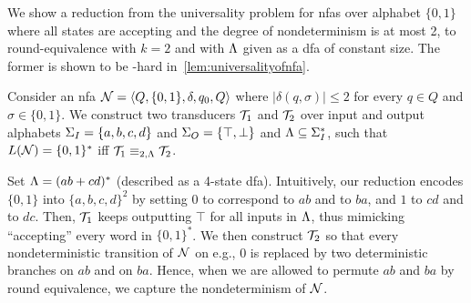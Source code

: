 We show a reduction from the universality problem for \glspl{nfa} over alphabet $\{0,1\}$ where all states are accepting and the degree of nondeterminism is at most 2, to round-equivalence with $k=2$ and with $\Lambda$ given as a \gls{dfa} of constant size. The former is shown to be \PSPACE-hard in~\autoref{lem:universalityofnfa}.

Consider an \gls{nfa} $\mathcal{N}=\left< Q,\{0,1\},\delta,q_0,Q\right>$ where $|\delta(q,\sigma)|\le 2$ for every $q\in Q$ and $\sigma\in \{0,1\}$.
We construct two transducers $\mathcal{T}_1$ and $\mathcal{T}_2$ over input and output alphabets $\Sigma_{I}=\{a,b,c,d\}$ and $\Sigma_{O}=\{\top,\bot\}$ and $\Lambda\subseteq \Sigma_{I}^*$, such that $L(\mathcal{N})=\{0,1\}^*$ iff $\mathcal{T}_1\equiv_{2,\Lambda}\mathcal{T}_2$. 

Set $\Lambda=(ab+cd)^*$ (described as a 4-state \gls{dfa}). Intuitively, our reduction encodes $\{0,1\}$ into $\{a,b,c,d\}^2$ by setting $0$ to correspond to $ab$ and to $ba$, and $1$ to $cd$ and to $dc$. Then, $\mathcal{T}_1$ keeps outputting $\top$ for all inputs in $\Lambda$, thus mimicking ``accepting'' every word in $\{0,1\}^*$. We then construct $\mathcal{T}_2$ so that every nondeterministic transition of $\mathcal{N}$ on e.g., $0$ is replaced by two deterministic branches on $ab$ and on $ba$. Hence, when we are allowed to permute $ab$ and $ba$ by round equivalence, we capture the nondeterminism of $\mathcal{N}$. 

